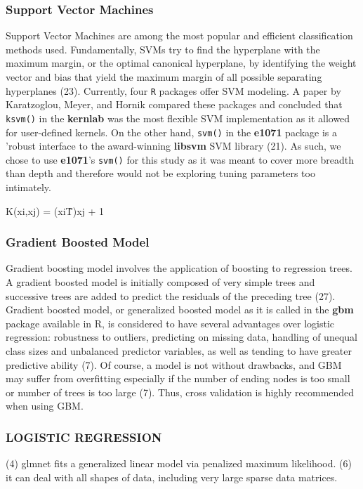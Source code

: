 \documentclass[a4paper]{article}
\begin{document}
\begin{multicols}{2}
\subsubsection*{Support Vector Machines}
Support Vector Machines are among the most popular and efficient classification methods used. Fundamentally, SVMs try to find the hyperplane with the maximum margin, or the optimal canonical hyperplane, by identifying the weight vector and bias that yield the maximum margin of all possible separating hyperplanes (23). Currently, four \texttt{R} packages offer SVM modeling. A paper by Karatzoglou, Meyer, and Hornik compared these packages and concluded that \texttt{ksvm()} in the \textbf{kernlab} was the most flexible SVM implementation as it allowed for user-defined kernels. On the other hand, \texttt{svm()} in the \textbf{e1071} package is a 'robust interface to the award-winning \textbf{libsvm} SVM library (21). As such, we chose to use \textbf{e1071}'s \texttt{svm()} for this study as it was meant to cover more breadth than depth and therefore would not be exploring tuning parameters too intimately.
\begin{center}
K(xi,xj) = (xi\^T)xj + 1
\end{center}

\subsubsection*{Gradient Boosted Model}
Gradient boosting model involves the application of boosting to regression trees. A gradient boosted model is initially composed of very simple trees and successive trees are added to predict the residuals of the preceding tree (27). Gradient boosted model, or generalized boosted model as it is called in the \textbf{gbm} package available in R, is considered to have several advantages over logistic regression: robustness to outliers, predicting on missing data, handling of unequal class sizes and unbalanced predictor variables, as well as tending to have greater predictive ability (7). Of course, a model is not without drawbacks, and GBM may suffer from overfitting especially if the number of ending nodes is too small or number of trees is too large (7). Thus, cross validation is highly recommended when using GBM.





\subsubsection*{LOGISTIC REGRESSION}
(4) glmnet fits a generalized linear model via penalized maximum likelihood.
(6) it can deal with all shapes of data, including very large sparse data matrices.


\end{multicols}
\end{document}
